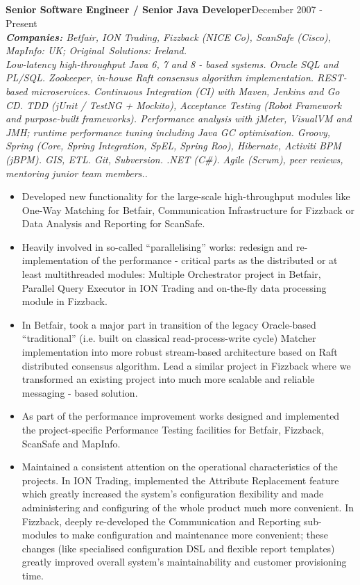 \documentclass{res}
\newcommand{\aggjobdes}[4]{\needspace{3\baselineskip} %
{\noindent \bf #1\hspace{2ex}}{\hfill #2}\\
{{\noindent \small \textit{ \textbf{ Companies:} {\hfill #3}}}}\\{{\it \small #4.}}}
\newcommand{\osection}[1]{\section{\sc {\Large \textbf{#1}\\}} \vspace{0.30cm}}
\begin{document}
\begin{resume}
\osection{Experience}
\aggjobdes {Senior Software Engineer / Senior Java Developer}{December 2007 - Present}
{Betfair, ION Trading, Fizzback (NICE Co), ScanSafe (Cisco), MapInfo: UK; Original~Solutions: Ireland.}
{Low-latency high-throughput Java 6, 7 and 8 - based systems. Oracle SQL and PL/SQL. Zookeeper, in-house Raft consensus algorithm implementation. REST-based microservices. Continuous Integration (CI) with Maven, Jenkins and Go CD. TDD (jUnit / TestNG + Mockito), Acceptance Testing (Robot Framework and purpose-built frameworks). Performance analysis with jMeter, VisualVM and JMH; runtime performance tuning including Java GC optimisation. Groovy, Spring (Core, Spring Integration, SpEL, Spring Roo), Hibernate, Activiti BPM (jBPM). GIS, ETL. Git, Subversion. .NET (C\#). Agile (Scrum), peer reviews, mentoring junior team members.}
\begin{itemize}
 \item Developed new functionality for the large-scale high-throughput modules like One-Way Matching for Betfair, Communication Infrastructure for Fizzback or Data Analysis and Reporting for ScanSafe.
 \item Heavily involved in so-called ``parallelising'' works: redesign and re-implementation of the performance - critical parts as the distributed or at least multithreaded modules: Multiple Orchestrator project in Betfair, Parallel Query Executor in ION Trading and on-the-fly data processing module in Fizzback.
 \item In Betfair, took a major part in transition of the legacy Oracle-based ``traditional'' (i.e. built on classical read-process-write cycle) Matcher implementation into more robust stream-based architecture based on Raft distributed consensus algorithm. Lead a similar project in Fizzback where we transformed an existing project into much more scalable and reliable messaging - based solution.
 \item As part of the performance improvement works designed and implemented the project-specific Performance Testing facilities for Betfair, Fizzback, ScanSafe and MapInfo.
 \item Maintained a consistent attention on the operational characteristics of the projects. In ION Trading, implemented the Attribute Replacement feature which greatly increased the system’s configuration flexibility and made administering and configuring of the whole product much more convenient. In Fizzback, deeply re-developed the Communication and Reporting sub-modules to make configuration and maintenance more convenient; these changes (like specialised configuration DSL and flexible report templates) greatly improved overall system's maintainability and customer provisioning time.

\end{itemize}
\end{resume}
\end{document}
